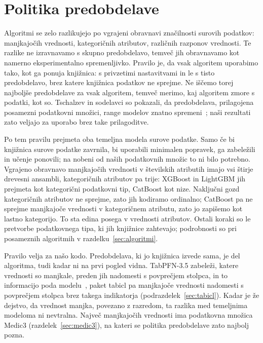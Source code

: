 \documentclass[a4paper,12pt,openright]{book}
\begin{document}
\section{Politika predobdelave}
\label{sec:predobdelava}

Algoritmi se zelo razlikujejo po vgrajeni obravnavi značilnosti surovih
podatkov: manjkajočih vrednosti, kategoričnih atributov, različnih razponov
vrednosti. Te razlike ne izravnavamo s skupno predobdelavo, temveč jih
obravnavamo kot namerno eksperimentalno spremenljivko. Pravilo je, da vsak
algoritem uporabimo tako, kot ga ponuja knjižnica: s privzetimi nastavitvami in
le s tisto predobdelavo, brez katere knjižnica podatkov ne sprejme. Ne iščemo
torej najboljše predobdelave za vsak algoritem, temveč merimo, kaj algoritem
zmore s podatki, kot so. Tschalzev in sodelavci so pokazali, da predobdelava,
prilagojena posamezni podatkovni množici, range modelov znatno
spremeni~\cite{tschalzev2024data}; naši rezultati zato veljajo za uporabo brez
take prilagoditve.

Po tem pravilu prejmeta oba temeljna modela surove podatke. Samo če bi
knjižnica surove podatke zavrnila, bi uporabili minimalen popravek, ga zabeležili
in učenje ponovili; na nobeni od naših podatkovnih množic to ni bilo
potrebno. Vgrajeno obravnavo manjkajočih vrednosti v številskih atributih imajo
vsi štirje drevesni ansambli, kategoričnih atributov pa trije: XGBoost in
LightGBM jih prejmeta kot kategorični podatkovni tip, CatBoost kot nize. Naključni gozd
kategoričnih atributov ne sprejme, zato jih kodiramo ordinalno; CatBoost pa ne
sprejme manjkajoče vrednosti v kategoričnem atributu, zato jo zapišemo kot
lastno kategorijo. To sta edina posega v vrednosti atributov. Ostali koraki so
le pretvorbe podatkovnega tipa, ki jih knjižnice zahtevajo; podrobnosti so pri
posameznih algoritmih v razdelku~\ref{sec:algoritmi}.

Pravilo velja za našo kodo. Predobdelava, ki jo knjižnica izvede sama, je del
algoritma, tudi kadar ni na prvi pogled vidna. TabPFN-3.5 zabeleži, katere
vrednosti so manjkale, preden jih nadomesti s povprečjem stolpca, in to
informacijo poda modelu~\cite{jager2026tabpfn35}, paket tabicl pa manjkajoče
vrednosti nadomesti s povprečjem stolpca brez takega indikatorja
(podrazdelek~\ref{sec:tabicl}).
Kadar je že dejstvo, da vrednost manjka, povezano z razredom, ta razlika med
temeljnima modeloma ni nevtralna. Največ manjkajočih vrednosti ima podatkovna
množica Medic3 (razdelek~\ref{sec:medic3}), na kateri se politika predobdelave
zato najbolj pozna.
\end{document}
